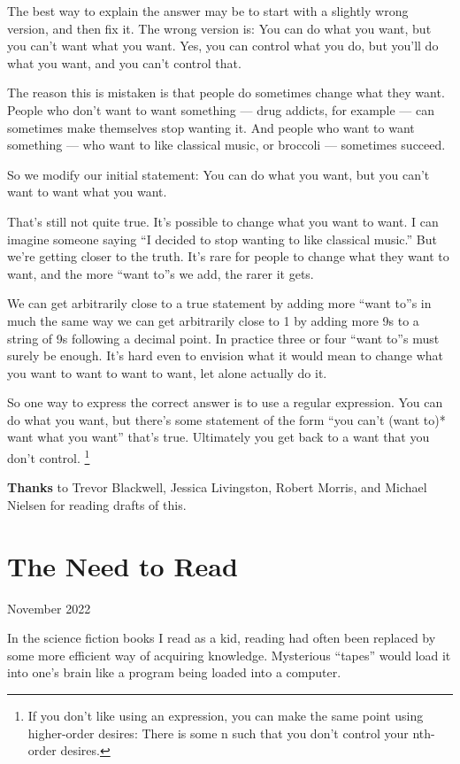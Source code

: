 \documentclass[12pt]{book}
\begin{document}
The best way to explain the answer may be to start with a slightly wrong
version, and then fix it. The wrong version is: You can do what you
want, but you can't want what you want. Yes, you can control what you
do, but you'll do what you want, and you can't control that.

The reason this is mistaken is that people do sometimes change what they
want. People who don't want to want something --- drug addicts, for
example --- can sometimes make themselves stop wanting it. And people
who want to want something --- who want to like classical music, or
broccoli --- sometimes succeed.

So we modify our initial statement: You can do what you want, but you
can't want to want what you want.

That's still not quite true. It's possible to change what you want to
want. I can imagine someone saying ``I decided to stop wanting to like
classical music.'' But we're getting closer to the truth. It's rare for
people to change what they want to want, and the more ``want to''s we
add, the rarer it gets.

We can get arbitrarily close to a true statement by adding more ``want
to''s in much the same way we can get arbitrarily close to 1 by adding
more 9s to a string of 9s following a decimal point. In practice three
or four ``want to''s must surely be enough. It's hard even to envision
what it would mean to change what you want to want to want to want, let
alone actually do it.

So one way to express the correct answer is to use a regular expression.
You can do what you want, but there's some statement of the form ``you
can't (want to)* want what you want'' that's true. Ultimately you get
back to a want that you don't control. \footnote{If you don't like using an expression, you can make the same
point using higher-order desires: There is some n such that you don't
control your nth-order desires.}


\textbf{Thanks} to Trevor Blackwell, Jessica Livingston, Robert Morris,
and Michael Nielsen for reading drafts of this.
\chapter{The Need to Read}

November 2022

In the science fiction books I read as a kid, reading had often been
replaced by some more efficient way of acquiring knowledge. Mysterious
``tapes'' would load it into one's brain like a program being loaded
into a computer.
\end{document}
